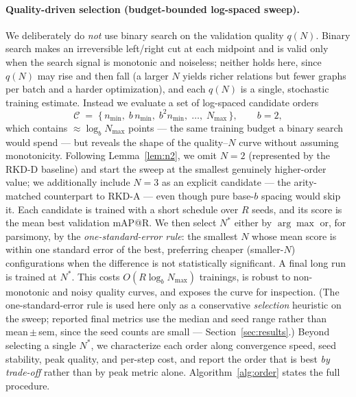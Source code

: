 \documentclass[11pt,letterpaper]{article}
\begin{document}
\paragraph{Quality-driven selection (budget-bounded log-spaced sweep).} We
deliberately do \emph{not} use binary search on the validation quality $q(N)$. Binary
search makes an irreversible left/right cut at each midpoint and is valid only when
the search signal is monotonic and noiseless; neither holds here, since $q(N)$ may
rise and then fall (a larger $N$ yields richer relations but fewer graphs per batch
and a harder optimization), and each $q(N)$ is a single, stochastic training estimate.
Instead we evaluate a set of log-spaced candidate orders
\begin{equation}
    \mathcal{C} \;=\; \{\, n_{\min},\; b\,n_{\min},\; b^2 n_{\min},\; \ldots,\; N_{\max} \,\},
    \qquad b = 2,
    \label{eq:order_candidates}
\end{equation}
which contains $\approx \log_b N_{\max}$ points --- the same training budget a binary
search would spend --- but reveals the shape of the quality--$N$ curve without
assuming monotonicity. Following Lemma~\ref{lem:n2}, we omit $N = 2$ (represented by
the RKD-D baseline) and start the sweep at the smallest genuinely higher-order value;
we additionally include $N = 3$ as an explicit candidate --- the arity-matched
counterpart to RKD-A --- even though pure base-$b$ spacing would skip it. Each
candidate is trained with a short schedule over $R$ seeds,
and its score is the mean best validation mAP@R. We then select $N^\ast$ either by
$\arg\max$ or, for parsimony, by the \emph{one-standard-error rule}: the smallest $N$
whose mean score is within one standard error of the best, preferring cheaper
(smaller-$N$) configurations when the difference is not statistically significant. A
final long run is trained at $N^\ast$. This costs $O(R \log_b N_{\max})$ trainings, is
robust to non-monotonic and noisy quality curves, and exposes the curve for
inspection. (The one-standard-error rule is used here only as a conservative
\emph{selection} heuristic on the sweep; reported final metrics use the median and
seed range rather than mean\,$\pm$\,sem, since the seed counts are small ---
Section~\ref{sec:results}.) Beyond selecting a single $N^\ast$, we characterize each
order along convergence speed, seed stability, peak quality, and per-step cost, and
report the order that is best \emph{by trade-off} rather than by peak metric alone.
Algorithm~\ref{alg:order} states the full procedure.
\end{document}
